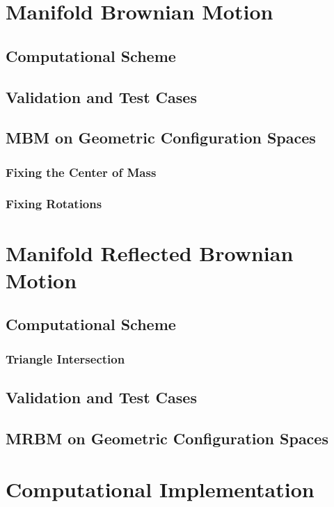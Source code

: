 %
\section{Manifold Brownian Motion}
\subsection{Computational Scheme}

\subsection{Validation and Test Cases}
\subsection{MBM on Geometric Configuration Spaces}
\subsubsection{Fixing the Center of Mass}
\subsubsection{Fixing Rotations}

\section{Manifold Reflected Brownian Motion}
\subsection{Computational Scheme}
\subsubsection{Triangle Intersection}
\subsection{Validation and Test Cases}
\subsection{MRBM on Geometric Configuration Spaces}

\section{Computational Implementation}
